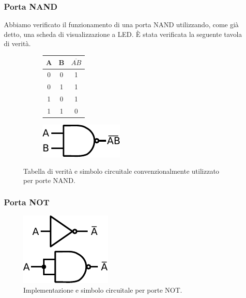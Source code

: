 \subsubsection{Porta NAND}

Abbiamo verificato il funzionamento di una porta NAND utilizzando, come già detto, una scheda di visualizzazione a LED.
È stata verificata la seguente tavola di verità.\\

\begin{figure}[htpc]
\centering
	\begin{subfigure}[hc]{.4\textwidth}
		\centering
		{\renewcommand{\arraystretch}{1.2}%
		\begin{tabular}{|c|c|c|}
		\hline
		A & B & $\overline{AB}$ \\
		\hline
		0 & 0 & 1\\
		\hline
		0 & 1 & 1\\
		\hline
		1 & 0 & 1\\
		\hline
		1 & 1 & 0\\
		\hline
		\end{tabular}}
		\label{tab9:NAND}
        \end{subfigure}
        \begin{subfigure}[hc]{.4\textwidth}
		\centering
		\includegraphics[width=.35\textwidth]{../E09/latex/NAND.pdf}
		\label{cir9:nand}
        \end{subfigure}
\caption{Tabella di verità e simbolo circuitale convenzionalmente utilizzato per porte NAND.}
\end{figure}

\subsubsection{Porta NOT}

\begin{figure}
\centering
\includegraphics[width=.16\textwidth]{../E09/latex/NOT.pdf}
\caption{Implementazione e simbolo circuitale per porte NOT.}
\label{cir9:not}
\end{figure}

